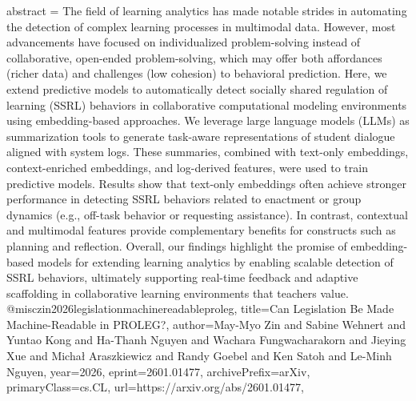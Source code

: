 {      abstract = {The field of learning analytics has made notable strides in automating the detection of complex learning processes in multimodal data. However, most advancements have focused on individualized problem-solving instead of collaborative, open-ended problem-solving, which may offer both affordances (richer data) and challenges (low cohesion) to behavioral prediction. Here, we extend predictive models to automatically detect socially shared regulation of learning (SSRL) behaviors in collaborative computational modeling environments using embedding-based approaches. We leverage large language models (LLMs) as summarization tools to generate task-aware representations of student dialogue aligned with system logs. These summaries, combined with text-only embeddings, context-enriched embeddings, and log-derived features, were used to train predictive models. Results show that text-only embeddings often achieve stronger performance in detecting SSRL behaviors related to enactment or group dynamics (e.g., off-task behavior or requesting assistance). In contrast, contextual and multimodal features provide complementary benefits for constructs such as planning and reflection. Overall, our findings highlight the promise of embedding-based models for extending learning analytics by enabling scalable detection of SSRL behaviors, ultimately supporting real-time feedback and adaptive scaffolding in collaborative learning environments that teachers value.}
}@misc{zin2026legislationmachinereadableproleg,
      title={Can Legislation Be Made Machine-Readable in PROLEG?}, 
      author={May-Myo Zin and Sabine Wehnert and Yuntao Kong and Ha-Thanh Nguyen and Wachara Fungwacharakorn and Jieying Xue and Michał Araszkiewicz and Randy Goebel and Ken Satoh and Le-Minh Nguyen},
      year={2026},
      eprint={2601.01477},
      archivePrefix={arXiv},
      primaryClass={cs.CL},
      url={https://arxiv.org/abs/2601.01477},
}

